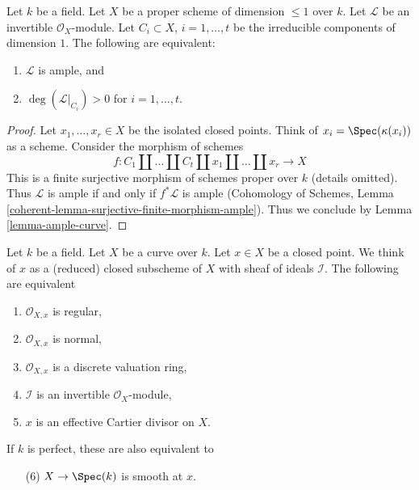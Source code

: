 \begin{lemma}
\label{lemma-ampleness-in-terms-of-degrees-components}
Let $k$ be a field. Let $X$ be a proper scheme of dimension $\leq 1$
over $k$. Let $\mathcal{L}$ be an invertible $\mathcal{O}_X$-module.
Let $C_i \subset X$, $i = 1, \ldots, t$ be the irreducible components
of dimension $1$. The following are equivalent:
\begin{enumerate}
\item $\mathcal{L}$ is ample, and
\item $\deg(\mathcal{L}|_{C_i}) > 0$ for $i = 1, \ldots, t$.
\end{enumerate}
\end{lemma}

\begin{proof}
Let $x_1, \ldots, x_r \in X$ be the isolated closed points.
Think of $x_i = \Spec(\kappa(x_i))$ as a scheme.
Consider the morphism of schemes
$$
f : C_1 \amalg \ldots \amalg C_t \amalg x_1 \amalg \ldots \amalg x_r
\longrightarrow X
$$
This is a finite surjective morphism of schemes proper over $k$
(details omitted). Thus $\mathcal{L}$ is ample if and only if
$f^*\mathcal{L}$ is ample (Cohomology of Schemes, Lemma
\ref{coherent-lemma-surjective-finite-morphism-ample}).
Thus we conclude by Lemma \ref{lemma-ample-curve}.
\end{proof}

\begin{lemma}
\label{lemma-regular-point-on-curve}
Let $k$ be a field. Let $X$ be a curve over $k$. Let $x \in X$ be a closed
point. We think of $x$ as a (reduced) closed subscheme of $X$ with sheaf
of ideals $\mathcal{I}$. The following are equivalent
\begin{enumerate}
\item $\mathcal{O}_{X, x}$ is regular,
\item $\mathcal{O}_{X, x}$ is normal,
\item $\mathcal{O}_{X, x}$ is a discrete valuation ring,
\item $\mathcal{I}$ is an invertible $\mathcal{O}_X$-module,
\item $x$ is an effective Cartier divisor on $X$.
\end{enumerate}
If $k$ is perfect, these are also equivalent to
\begin{enumerate}
\item[(6)] $X \to \Spec(k)$ is smooth at $x$.
\end{enumerate}
\end{lemma}

